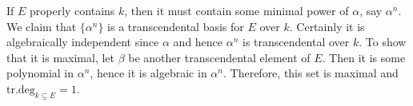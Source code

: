 \documentclass[../../master.tex]{subfiles}
\begin{document}
\begin{solution}
    If $E$ properly contains $k$, then it must contain some minimal power of $\alpha$, say $\alpha^{n}$.
    We claim that $\{\alpha^{n}\}$ is a transcendental basis for $E$ over $k$.
    Certainly it is algebraically independent since $\alpha$ and hence $\alpha^{n}$ is transcendental over $k$.
    To show that it is maximal, let $\beta$ be another transcendental element of $E$.
    Then it is some polynomial in $\alpha^{n}$, hence it is algebraic in  $\alpha^{n}$.
    Therefore, this set is maximal and $\text{tr.deg}_{k \subseteq E} = 1$.
\end{solution}
\end{document}
